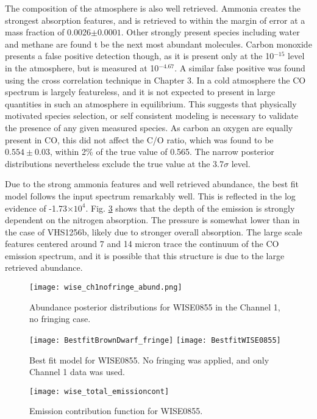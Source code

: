 The composition of the atmosphere is also well retrieved.
Ammonia creates the strongest absorption features, and is retrieved to within the margin of error at a mass fraction of 0.0026$\pm0.0001$.
Other strongly present species including water and methane are found t be the next most abundant molecules.
Carbon monoxide presents a false positive detection though, as it is present only at the 10$^{-15}$ level in the atmosphere, but is measured at 10$^{-4.67}$.
A similar false positive was found using the cross correlation technique in Chapter 3.
In a cold atmosphere the CO spectrum is largely featureless, and it is not expected to present in large quantities in such an atmosphere in equilibrium.
This suggests that physically motivated species selection, or self consistent modeling is necessary to validate the presence of any given measured species.
As carbon an oxygen are equally present in CO, this did not affect the C/O ratio, which was found to be $0.554\pm0.03$, within 2\% of the true value of 0.565.
The narrow posterior distributions nevertheless exclude the true value at the 3.7$\sigma$ level.

Due to the strong ammonia features and well retrieved abundance, the best fit model follows the input spectrum remarkably well.
This is reflected in the log evidence of -1.73$\times10^{4}$.
Fig. \ref{fig:WISEemcont} shows that the depth of the emission is strongly dependent on the nitrogen absorption. 
The pressure is somewhat lower than in the case of VHS1256b, likely due to stronger overall absorption. 
The large scale features centered around 7 and 14 micron trace the continuum of the CO emission spectrum, and it is possible that this structure is due to the large retrieved abundance.
\begin{figure}[h]
	\texttt{[image: wise\_ch1nofringe\_abund.png]}
	\caption{Abundance posterior distributions for WISE0855 in the Channel 1, no fringing case.}
	\label{fig:postWISEabund}
\end{figure}
\begin{figure}[h]
	\texttt{[image: BestfitBrownDwarf\_fringe]}
	\texttt{[image: BestfitWISE0855]}
	\caption{Best fit model for WISE0855. No fringing was applied, and only Channel 1 data was used.}
	\label{fig:bestfitWISE}
\end{figure}
\begin{figure}[h]
	\texttt{[image: wise\_total\_emissioncont]}
	\caption{Emission contribution function for WISE0855.}
	\label{fig:WISEemcont}
\end{figure}
\clearpage

